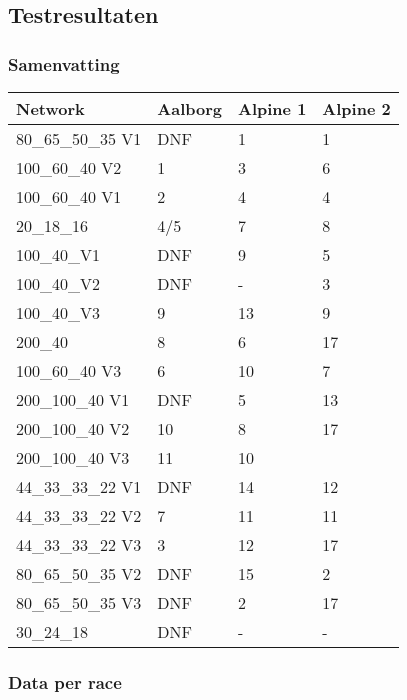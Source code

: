 \subsection{Testresultaten}
\label{testresulaten}
\subsubsection*{Samenvatting}
\begin{table}[H]
\begin{tabular}{llll}
 \textbf{Network} & \textbf{Aalborg} & \textbf{Alpine 1} & \textbf{Alpine 2}\\ \hline
 80\_65\_50\_35 V1 & DNF & 1 & 1 \\
 100\_60\_40 V2 & 1 & 3 & 6\\
 100\_60\_40 V1 & 2 & 4 & 4 \\ \hline
 20\_18\_16 & 4/5 & 7 & 8 \\
 100\_40\_V1 & DNF & 9 & 5 \\
 100\_40\_V2 & DNF & - & 3\\
 100\_40\_V3 & 9 & 13 & 9 \\
 200\_40 & 8 & 6 & 17 \\
 100\_60\_40 V3 & 6 & 10 & 7 \\
 200\_100\_40 V1 & DNF & 5 & 13 \\
 200\_100\_40 V2 & 10 & 8 & 17\\
 200\_100\_40 V3 & 11 & 10 \\
 44\_33\_33\_22 V1 & DNF & 14 & 12\\
 44\_33\_33\_22 V2 & 7 & 11& 11\\
 44\_33\_33\_22 V3 & 3 & 12 & 17\\
 80\_65\_50\_35 V2 & DNF & 15 & 2\\
 80\_65\_50\_35 V3 & DNF & 2 & 17\\
 30\_24\_18 & DNF & - & - \\
\end{tabular}
\end{table}

\pagebreak
\subsubsection*{Data per race}

